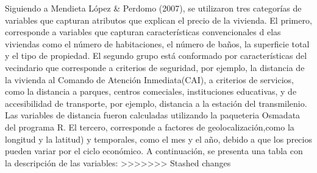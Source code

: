 \documentclass[
  11pt,
  letterpaper,
]{article}
\begin{document}
Siguiendo a Mendieta López \& Perdomo (2007), se utilizaron tres categorías de variables que capturan atributos que explican el precio de la vivienda. El primero, corresponde a variables que capturan características convencionales d elas viviendas como el número de habitaciones, el número de baños, la superficie total y el tipo de propiedad. El segundo grupo está conformado por características del vecindario que corresponde a criterios de seguridad, por ejemplo, la distancia de la vivienda al Comando de Atención Inmediata(CAI), a criterios de servicios, como la distancia a parques, centros comeciales, instituciones educativas, y de accesibilidad de transporte, por ejemplo, distancia a la estación del transmilenio. Las variables de distancia fueron calculadas utilizando la paqueteria Osmadata del programa R. El tercero, corresponde a factores de geolocalización,como la longitud y la latitud) y temporales, como el mes y el año, debido a que los precios pueden variar por el ciclo económico. A continuación, se presenta una tabla con la descripción de las variables:
\textgreater\textgreater\textgreater\textgreater\textgreater\textgreater\textgreater{} Stashed changes
\end{document}
